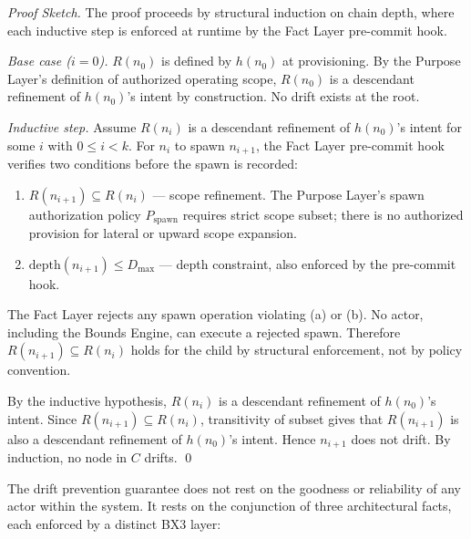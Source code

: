 \begin{proof}[Proof Sketch]
The proof proceeds by structural induction on chain depth, where each inductive step is enforced at runtime by the Fact Layer pre-commit hook.

\medskip
\noindent\textit{Base case ($i=0$).} $R(n_0)$ is defined by $h(n_0)$ at provisioning. By the Purpose Layer's definition of authorized operating scope, $R(n_0)$ is a descendant refinement of $h(n_0)$'s intent by construction. No drift exists at the root.

\medskip
\noindent\textit{Inductive step.} Assume $R(n_i)$ is a descendant refinement of $h(n_0)$'s intent for some $i$ with $0 \leq i < k$. For $n_i$ to spawn $n_{i+1}$, the Fact Layer pre-commit hook verifies two conditions before the spawn is recorded:

\begin{enumerate}
    \item[(a)] $R(n_{i+1}) \subseteq R(n_i)$ --- scope refinement. The Purpose Layer's spawn authorization policy $P_{\mathrm{spawn}}$ requires strict scope subset; there is no authorized provision for lateral or upward scope expansion.
    \item[(b)] $\mathrm{depth}(n_{i+1}) \leq D_{\mathrm{max}}$ --- depth constraint, also enforced by the pre-commit hook.
\end{enumerate}

The Fact Layer rejects any spawn operation violating (a) or (b). No actor, including the Bounds Engine, can execute a rejected spawn. Therefore $R(n_{i+1}) \subseteq R(n_i)$ holds for the child by structural enforcement, not by policy convention.

By the inductive hypothesis, $R(n_i)$ is a descendant refinement of $h(n_0)$'s intent. Since $R(n_{i+1}) \subseteq R(n_i)$, transitivity of subset gives that $R(n_{i+1})$ is also a descendant refinement of $h(n_0)$'s intent. Hence $n_{i+1}$ does not drift. By induction, no node in $C$ drifts. \qed
\end{proof}

\medskip
The drift prevention guarantee does not rest on the goodness or reliability of any actor within the system. It rests on the conjunction of three architectural facts, each enforced by a distinct BX3 layer:

